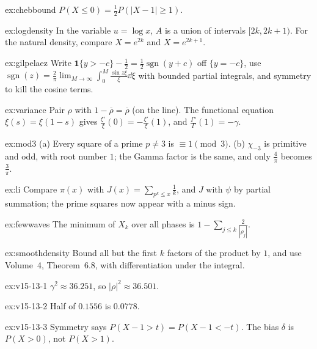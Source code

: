 \begin{hint}{ex:chebbound}
$P(X\le0)=\frac12P(|X-1|\ge1)$.
\end{hint}
\begin{hint}{ex:logdensity}
In the variable $u=\log x$, $A$ is a union of intervals $[2k,2k+1)$. For the natural density, compare $X=e^{2k}$ and $X=e^{2k+1}$.
\end{hint}
\begin{hint}{ex:gilpelaez}
Write $\mathbf 1\{y>-c\}-\frac12=\frac12\operatorname{sgn}(y+c)$ off $\{y=-c\}$, use $\operatorname{sgn}(z)=\frac2\pi\lim_{M\to\infty}\int_0^M\frac{\sin z\xi}\xi\dd\xi$ with bounded partial integrals, and symmetry to kill the cosine terms.
\end{hint}
\begin{hint}{ex:variance}
Pair $\rho$ with $1-\overline\rho=\overline\rho$ (on the line). The functional equation $\xi(s)=\xi(1-s)$ gives $\frac{\xi'}\xi(0)=-\frac{\xi'}\xi(1)$, and $\frac{\Gamma'}\Gamma(1)=-\gamma$.
\end{hint}
\begin{hint}{ex:mod3}
(a) Every square of a prime $p\ne3$ is $\equiv1\pmod3$. (b) $\chi_{-3}$ is primitive and odd, with root number $1$; the Gamma factor is the same, and only $\frac4\pi$ becomes $\frac3\pi$.
\end{hint}
\begin{hint}{ex:li}
Compare $\pi(x)$ with $J(x)=\sum_{p^k\le x}\frac1k$, and $J$ with $\psi$ by partial summation; the prime squares now appear with a minus sign.
\end{hint}

\begin{hint}{ex:fewwaves}
The minimum of $X_k$ over all phases is $1-\sum_{j\le k}\frac2{|\rho_j|}$.
\end{hint}
\begin{hint}{ex:smoothdensity}
Bound all but the first $k$ factors of the product by $1$, and use Volume~4, Theorem~6.8, with differentiation under the integral.
\end{hint}

\begin{hint}{ex:v15-13-1}
\(\gamma^2\approx36.251\), so \(|\rho|^2\approx36.501\).
\end{hint}

\begin{hint}{ex:v15-13-2}
Half of \(0.1556\) is \(0.0778\).
\end{hint}

\begin{hint}{ex:v15-13-3}
Symmetry says \(P(X-1>t)=P(X-1<-t)\). The bias \(\delta\) is \(P(X>0)\), not \(P(X>1)\).
\end{hint}

